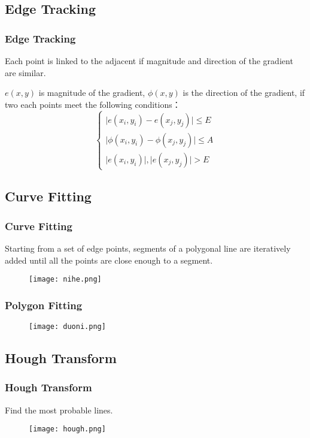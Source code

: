 \documentclass[notheorems,serif,table,compress]{beamer}  %
\begin{document}
\subsection{Edge Tracking}
\begin{frame}
\frametitle{Edge Tracking}
Each point is linked to the adjacent if magnitude and direction of the gradient are similar.\newline
\begin{tcolorbox}[colback=red!5,colframe=blue!75!black]
$e(x,y)$ is magnitude of the gradient, $\phi(x,y)$ is the direction of the gradient, if two each points meet the following conditions：
    \begin{displaymath}
        \left\{ \begin{array}{ll}
        \mid e(x_{i},y_{i})-e(x_{j},y_{j}) \mid \leq E\\
        \mid \phi(x_{i},y_{i})-\phi(x_{j},y_{j}) \mid \leq A\\
        \mid e(x_{i},y_{i}) \mid , \mid e(x_{j},y_{j}) \mid > E
         \end{array} \right.
\end{displaymath}
\end{tcolorbox}
\end{frame}

\subsection{Curve Fitting}
\begin{frame}
\frametitle{Curve Fitting}
Starting from a set of edge points, segments of a polygonal line are iteratively added until all the points are close enough to a segment.
    \begin{figure}
    \texttt{[image: nihe.png]} 
    \end{figure}
\end{frame}

\begin{frame}
\frametitle{Polygon Fitting}
    \begin{figure}
    \texttt{[image: duoni.png]} 
    \end{figure}
\end{frame}

\subsection{Hough Transform}
\begin{frame}
\frametitle{Hough Transform}
Find the most probable lines.
    \begin{figure}
    \texttt{[image: hough.png]} 
    \end{figure}
\end{frame}
\end{document}
